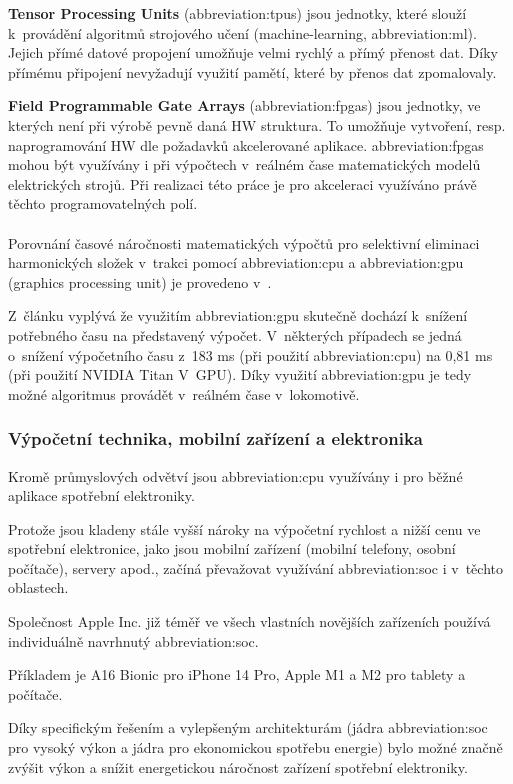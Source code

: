 \documentclass[a4paper, twoside, 11pt]{article}
\begin{document}
		\textbf{Tensor Processing Units} (\gls{abbreviation:tpus}) jsou jednotky, které slouží k~provádění algoritmů strojového učení (machine-learning, \gls{abbreviation:ml}). Jejich přímé datové propojení umožňuje velmi rychlý a přímý přenost dat. Díky přímému připojení nevyžadují využití pamětí, které by přenos dat zpomalovaly. \cite{xilinx-accelerated-computing}\par
		\textbf{Field Programmable Gate Arrays} (\gls{abbreviation:fpgas}) jsou jednotky, ve kterých není při výrobě pevně daná HW struktura. To umožňuje vytvoření, resp. naprogramování HW dle požadavků akcelerované aplikace. \gls{abbreviation:fpgas} mohou být využívány i při výpočtech v~reálném čase matematických modelů elektrických strojů. Při realizaci této práce je pro akceleraci využíváno právě těchto programovatelných polí.\\ \\
		\noindent Porovnání časové náročnosti matematických výpočtů pro selektivní eliminaci harmonických složek v~trakci pomocí \gls{abbreviation:cpu} a \gls{abbreviation:gpu} (graphics processing unit) je provedeno v~\cite{ieee-selective-harmonic-elimination-nvidia}.\par
		Z~článku vyplývá že využitím \gls{abbreviation:gpu} skutečně dochází k~snížení potřebného času na představený výpočet. V~některých případech se jedná o~snížení výpočetního času z~183 ms (při použití \gls{abbreviation:cpu}) na 0,81 ms (při použití NVIDIA Titan V~GPU). Díky využití \gls{abbreviation:gpu} je tedy možné algoritmus provádět v~reálném čase v~lokomotivě.

	\subsubsection{Výpočetní technika, mobilní zařízení a elektronika}
	Kromě průmyslových odvětví jsou \gls{abbreviation:cpu} využívány i pro běžné aplikace spotřební elektroniky.\par
	Protože jsou kladeny stále vyšší nároky na výpočetní rychlost a nižší cenu ve spotřební elektronice, jako jsou mobilní zařízení (mobilní telefony, osobní počítače), servery apod., začíná převažovat využívání \gls{abbreviation:soc} i v~těchto oblastech.\par
	Společnost Apple Inc. již téměř ve všech vlastních novějších zařízeních používá individuálně navrhnutý \gls{abbreviation:soc}.\par
	Příkladem je A16 Bionic pro iPhone 14 Pro, Apple M1 a M2 pro tablety a počítače.\par
	Díky specifickým řešením a vylepšeným architekturám (jádra \gls{abbreviation:soc} pro vysoký výkon a jádra pro ekonomickou spotřebu energie) bylo možné značně zvýšit výkon a snížit energetickou náročnost zařízení spotřební elektroniky. \cite{apple-explore-the-new-architecture-of-apple-silicon-macs}
\end{document}
